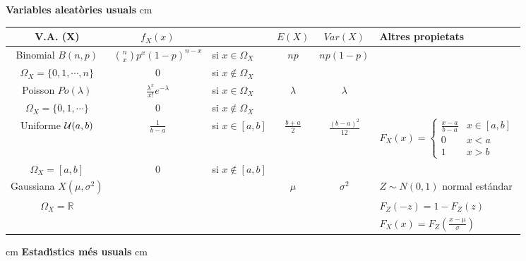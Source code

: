 \documentclass[a4paper,10pt]{article}
\begin{document}
\vskip 1cm

\newpage

\vskip 5cm
\textbf{Variables aleat\`ories usuals}
 cm

\begin{tabular}{|c|cl|c|c|l|}
V.A. (X) & $f_X(x)$ & & $E(X)$ & $Var(X)$ & Altres propietats \\
\hline
Binomial $B(n, p)$ & $\binom{n}{x} p^x (1-p)^{n-x}$ & si $x\in \Omega_X$ &
 $np$ & $np(1-p)$ & \\
$\Omega_X=\{ 0, 1, \cdots, n \}$ & $0$ & si $x \notin \Omega_X$ & & & \\ \hline
Poisson $Po(\lambda)$ & $\frac{\lambda^x}{x!} e^{-\lambda}$ & si $x\in \Omega_X$ & 
 $\lambda$ & $\lambda$ & \\
$\Omega_X=\{ 0, 1, \cdots \}$ & $0$ & si $x \notin \Omega_X$ & & & \\ \hline
Uniforme ${\cal U}(a, b)$ & $\frac{1}{b-a}$ & si $x \in [a, b]$ & 
$\frac{b+a}{2}$ & $\frac{(b-a)^2}{12}$ & 
$F_X(x)=\begin{cases} 
\frac{x-a}{b-a} & x \in [a, b] \\
0 & x < a \\
1 & x > b
\end{cases}$ \\
$\Omega_X=[a, b]$ & 0 & si $x \notin [a, b]$ &  & & \\ \hline
Gaussiana $X(\mu, \sigma^2)$ & & & $\mu$ & $\sigma^2$ & $Z\sim N(0, 1)$ normal est\'andar \\
$\Omega_X=\mathbb{R}$ & & & &  & $F_Z(-z)=1-F_Z(z)$ \\
 & & & &  & $F_X(x)=F_Z(\frac{x-\mu}{\sigma})$ \\ \hline
\end{tabular}

 cm
\textbf{Estad\'\i stics m\'es usuals}
 cm
\end{document}
